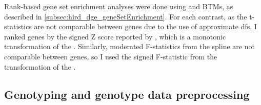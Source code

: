 Rank-based gene set enrichment analyses were done using  \autocite{weiner3rd2016TmodPackageGeneral} and \glspl{BTM}, as described in \cref{subsec:hird_dge_geneSetEnrichment}.
%
For each contrast, 
as the t-statistics are not comparable between genes due to the use of approximate \glspl{df},
I ranked genes by the signed Z score reported by , which is a monotonic transformation of the \pvalue{}.
Similarly, moderated F-statistics from the spline are not comparable between genes, so I used the signed F-statistic from the transformation of the \pvalue{}.


\subsection{Genotyping and genotype data preprocessing}

%
%
%
%

